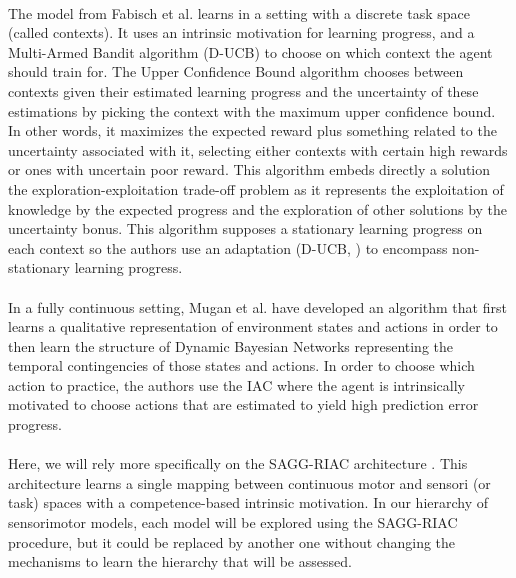 \documentclass[12pt]{article}
\begin{document}
		\paragraph{}
		The model from Fabisch et al. \cite{fabisch2014active} learns in a setting with a discrete task space (called contexts).
		It uses an intrinsic motivation for learning progress, and a Multi-Armed Bandit algorithm (D-UCB) to choose on which context the agent should train for.
		The Upper Confidence Bound algorithm chooses between contexts given their estimated learning progress and the uncertainty of these estimations
		by picking the context with the maximum upper confidence bound.
		In other words, it maximizes the expected reward plus something related to the uncertainty associated with it, selecting either contexts with 
		certain high rewards or ones with uncertain poor reward.
		This algorithm embeds directly a solution the exploration-exploitation trade-off problem as it represents the exploitation 
		of knowledge by the expected progress and the exploration of other solutions by the uncertainty bonus. 
		This algorithm supposes a stationary learning progress on each context so the authors use an adaptation 
		(D-UCB, \cite{kocsis2006discounted}) to encompass non-stationary learning progress.
		
		\paragraph{}
		In a fully continuous setting, Mugan et al. \cite{mugan} have developed an algorithm that first learns a qualitative representation of environment states
		and actions in order to then learn the structure of Dynamic Bayesian Networks representing the temporal contingencies of those states and actions.
		In order to choose which action to practice, the authors use the IAC \cite{oudeyer_intrinsic_2007} where the agent 
		is intrinsically motivated to choose actions that are estimated to yield high prediction error progress.
		
		\paragraph{}
		Here, we will rely more specifically on the SAGG-RIAC architecture \cite{baranes_active_2013}.
		This architecture learns a single mapping between continuous motor and sensori (or task) 
		spaces with a competence-based intrinsic motivation. 
		In our hierarchy of sensorimotor models, each model will be explored using the SAGG-RIAC procedure, but it could be replaced by another one 
		without changing the mechanisms to learn the hierarchy that will be assessed.
\end{document}
